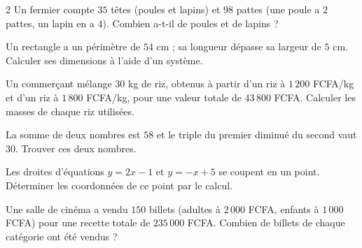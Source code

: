 \begin{multicols}{2}
\exo{} Un fermier compte $35$ têtes (poules et lapins) et $98$ pattes (une poule a
$2$ pattes, un lapin en a $4$). Combien a-t-il de poules et de lapins ?

\exo{} Un rectangle a un périmètre de $54$ cm ; sa longueur dépasse sa largeur de
$5$ cm. Calculer ses dimensions à l'aide d'un système.

\exo{} Un commerçant mélange $30$ kg de riz, obtenus à partir d'un riz à $1\,200$
FCFA/kg et d'un riz à $1\,800$ FCFA/kg, pour une valeur totale de $43\,800$ FCFA. Calculer
les masses de chaque riz utilisées.

\exo{} La somme de deux nombres est $58$ et le triple du premier diminué du second
vaut $30$. Trouver ces deux nombres.

\exo{} Les droites d'équations $y=2x-1$ et $y=-x+5$ se coupent en un point.
Déterminer les coordonnées de ce point par le calcul.

\exo{} Une salle de cinéma a vendu $150$ billets (adultes à $2\,000$ FCFA, enfants
à $1\,000$ FCFA) pour une recette totale de $235\,000$ FCFA. Combien de billets de chaque
catégorie ont été vendus ?

\end{multicols}

